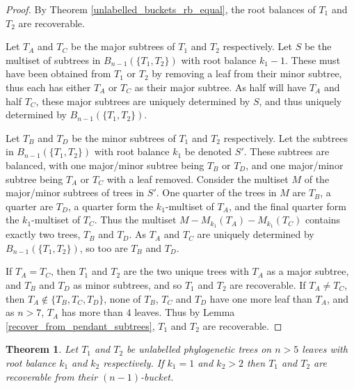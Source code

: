 \documentclass[12pt]{article}
\newtheorem{Theorem}{Theorem}[section]
\theoremstyle{definition}
\begin{document}
\begin{proof}
    By Theorem \ref{unlabelled_buckets_rb_equal}, the root balances of $T_1$ and $T_2$ are recoverable.
    
    Let $T_A$ and $T_C$ be the major subtrees of $T_1$ and $T_2$ respectively. Let $S$ be the multiset of subtrees in $B_{n-1}(\{T_1, T_2\})$ with root balance $k_1 - 1$. These must have been obtained from $T_1$ or $T_2$ by removing a leaf from their minor subtree, thus each has either $T_A$ or $T_C$ as their major subtree. As half will have $T_A$ and half $T_C$, these major subtrees are uniquely determined by $S$, and thus uniquely determined by $B_{n-1}(\{T_1, T_2\})$.
    
    Let $T_B$ and $T_D$ be the minor subtrees of $T_1$ and $T_2$ respectively. Let the subtrees in $B_{n-1}(\{T_1, T_2\})$ with root balance $k_1$ be denoted $S'$. These subtrees are balanced, with one major/minor subtree being $T_B$ or $T_D$, and one major/minor subtree being $T_A$ or $T_C$ with a leaf removed. Consider the multiset $M$ of the major/minor subtrees of trees in $S'$. One quarter of the trees in $M$ are $T_B$, a quarter are $T_D$, a quarter form the $k_1$-multiset of $T_A$, and the final quarter form the $k_1$-multiset of $T_C$. Thus the multiset $M - M_{k_1}(T_A)-M_{k_1}(T_C)$ contains exactly two trees, $T_B$ and $T_D$. As $T_A$ and $T_C$ are uniquely determined by $B_{n-1}(\{T_1, T_2\})$, so too are $T_B$ and $T_D$.
    
    If $T_A = T_C$, then $T_1$ and $T_2$ are the two unique trees with $T_A$ as a major subtree, and $T_B$ and $T_D$ as minor subtrees, and so $T_1$ and $T_2$ are recoverable. If $T_A \neq T_C$, then $T_A \notin \{T_B, T_C, T_D\}$, none of $T_B$, $T_C$ and $T_D$ have one more leaf than $T_A$, and as $n>7$, $T_A$ has more than $4$ leaves. Thus by Lemma \ref{recover_from_pendant_subtrees}, $T_1$ and $T_2$ are recoverable.
    
\end{proof}

\begin{Theorem}\label{unlabelled_buckets_theorem4}
    Let $T_1$ and $T_2$ be unlabelled phylogenetic trees on $n>5$ leaves with root balance $k_1$ and $k_2$ respectively. If $k_1 = 1$ and $k_2 > 2$ then $T_1$ and $T_2$ are recoverable from their $(n-1)$-bucket.
\end{Theorem}
\end{document}
